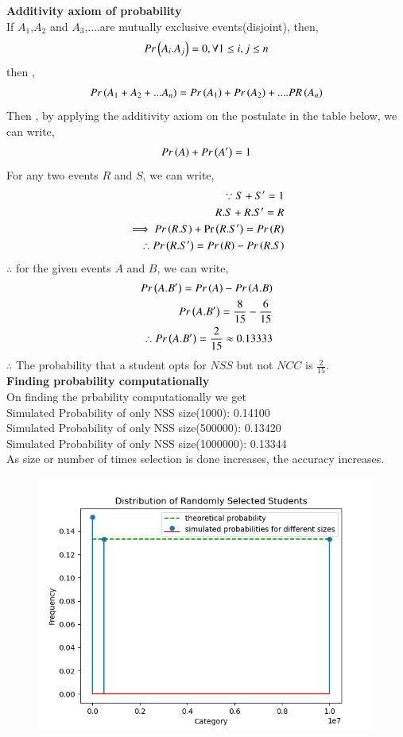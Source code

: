 \documentclass[journal]{IEEEtran}
\begin{document}
\textbf{Additivity axiom of probability}
\\
If $A_1$,$A_2$ and $A_3$,....are mutually exclusive events(disjoint), then,
\begin{align}
    Pr\left(A_i.A_j\right) = 0, \forall  1 \leq i,j \leq n
\end{align}
then ,
\begin{align}
    Pr\left(A_1+A_2+...A_n\right) = Pr\left(A_1\right) + Pr\left(A_2\right) + ....PR\left(A_n\right) 
\end{align}
Then , by applying the additivity axiom on the postulate  in the table below, we can write,
\begin{align}
    Pr\left(A\right) + Pr\left(A^\prime\right) = 1
\end{align}
For any two events $R$ and $S$, we can write,
\begin{align}
    \because S + S^\prime = 1\\
    R.S + R.S^\prime = R\\
    \implies Pr\left(R.S\right) + \Pr\left(R.S^\prime\right) = Pr\left(R\right)\\
    \therefore Pr\left(R.S^\prime\right) = Pr\left(R\right) - Pr\left(R.S\right)
\end{align}
$\therefore$ for the given events $A$ and $B$, we can write,
\begin{align}
Pr\left(A.B^\prime\right) = Pr\left(A\right) - Pr\left(A.B\right)\\
    Pr\left(A.B^\prime\right) = \frac{8}{15} - \frac{6}{15}\\
    \therefore Pr\left(A.B^\prime\right) = \frac{2}{15} \approx 0.13333
\end{align}
$\therefore$ The probability that a student opts for $NSS$ but not $NCC$ is $\frac{2}{15}$.\\
\textbf{Finding probability computationally}
\\
On finding the prbability computationally we get\\
Simulated Probability of only  NSS size(1000): 0.14100\\
Simulated Probability of only  NSS size(500000): 0.13420\\
Simulated Probability of only  NSS size(1000000): 0.13344\\
As size or number of times selection is done increases, the accuracy increases.

\begin{figure}[h!]
   \centering
   \includegraphics[width=1\columnwidth]{figures/Figure_1.png}
   \label{graph of the function}
\end{figure}
\end{document}
